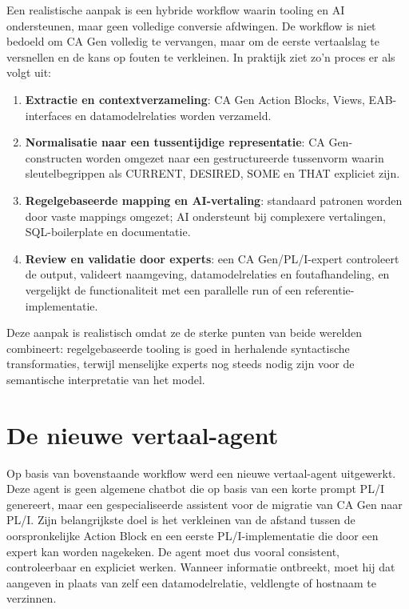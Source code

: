 Een realistische aanpak is een hybride workflow waarin tooling en AI
ondersteunen, maar geen volledige conversie afdwingen. De workflow is
niet bedoeld om CA Gen volledig te vervangen, maar om de eerste vertaalslag
te versnellen en de kans op fouten te verkleinen. In praktijk ziet zo'n
proces er als volgt uit:
\begin{enumerate}
    \item \textbf{Extractie en contextverzameling}: CA Gen Action Blocks,
    Views, EAB-interfaces en datamodelrelaties worden verzameld.
    \item \textbf{Normalisatie naar een tussentijdige representatie}: CA Gen-
    constructen worden omgezet naar een gestructureerde tussenvorm waarin
    sleutelbegrippen als CURRENT, DESIRED, SOME en THAT expliciet zijn.
    \item \textbf{Regelgebaseerde mapping en AI-vertaling}: standaard
    patronen worden door vaste mappings omgezet; AI ondersteunt bij
    complexere vertalingen, SQL-boilerplate en documentatie.
    \item \textbf{Review en validatie door experts}: een CA Gen/PL/I-expert
    controleert de output, valideert naamgeving, datamodelrelaties en
    foutafhandeling, en vergelijkt de functionaliteit met een parallelle
    run of een referentie-implementatie.
\end{enumerate}

Deze aanpak is realistisch omdat ze de sterke punten van beide werelden
combineert: regelgebaseerde tooling is goed in herhalende syntactische
transformaties, terwijl menselijke experts nog steeds nodig zijn voor de
semantische interpretatie van het model.


\section{De nieuwe vertaal-agent}
\label{sec:nieuwe-vertaal-agent}

Op basis van bovenstaande workflow werd een nieuwe vertaal-agent uitgewerkt.
Deze agent is geen algemene chatbot die op basis van een korte prompt PL/I
genereert, maar een gespecialiseerde assistent voor de migratie van CA Gen naar
PL/I. Zijn belangrijkste doel is het verkleinen van de afstand tussen de
oorspronkelijke Action Block en een eerste PL/I-implementatie die door een
expert kan worden nagekeken. De agent moet dus vooral consistent, controleerbaar
en expliciet werken. Wanneer informatie ontbreekt, moet hij dat aangeven in
plaats van zelf een datamodelrelatie, veldlengte of hostnaam te verzinnen.

